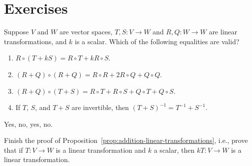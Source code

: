 \section*{Exercises}

\begin{ex}
  Suppose $V$ and $W$ are vector spaces, $T,S:V\to W$ and $R,Q:W\to W$
  are linear transformations, and $k$ is a scalar. Which of the
  following equalities are valid?
  \begin{enumerate}
  \item $R\circ (T+kS) = R\circ T + kR \circ S$.
  \item $(R+Q)\circ (R+Q) = R\circ R + 2R\circ Q + Q\circ Q$.
  \item $(R+Q)\circ (T+S) = R\circ T + R\circ S + Q\circ T + Q\circ S$.
  \item If $T$, $S$, and $T+S$ are invertible, then $(T+S)^{-1} =
    T^{-1} + S^{-1}$.
  \end{enumerate}
  \begin{sol}
    Yes, no, yes, no.
  \end{sol}
\end{ex}

\begin{ex}
  Finish the proof of
  Proposition~\ref{prop:addition-linear-transformations}, i.e., prove
  that if $T:V\to W$ is a linear transformation and $k$ a scalar, then
  $kT:V\to W$ is a linear transformation.
\end{ex}
